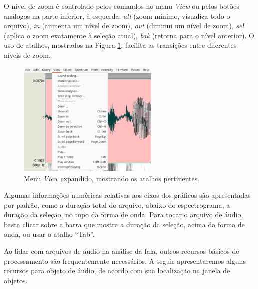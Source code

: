 \documentclass[portuguese]{textolivre}
\begin{document}
O nível de zoom é controlado pelos comandos no menu \textit{View} ou pelos botões análogos na parte inferior, à esquerda: \textit{all} (zoom mínimo, visualiza todo o arquivo), \textit{in} (aumenta um nível de zoom), \textit{out} (diminui um nível de zoom), \textit{sel} (aplica o zoom exatamente à seleção atual), \textit{bak} (retorna para o nível anterior). O uso de atalhos, mostrados na Figura \ref{fig8}, facilita as transições entre diferentes níveis de zoom.

\begin{figure}[H]
 \centering
 \includegraphics[width=0.6\textwidth]{Fig8.png}
 \caption{Menu \textit{View} expandido, mostrando os atalhos pertinentes.}
 \label{fig8}
\end{figure}

Algumas informações numéricas relativas aos eixos dos gráficos são apresentadas por padrão, como a duração total do arquivo, abaixo do espectrograma, a duração da seleção, no topo da forma de onda. Para tocar o arquivo de áudio, basta clicar sobre a barra que mostra a duração da seleção, acima da forma de onda, ou usar o atalho ``Tab''.

Ao lidar com arquivos de áudio na análise da fala, outros recursos básicos de processamento são frequentemente necessários. A seguir apresentaremos alguns recursos para objeto de áudio, de acordo com sua localização na janela de objetos. 
\end{document}
